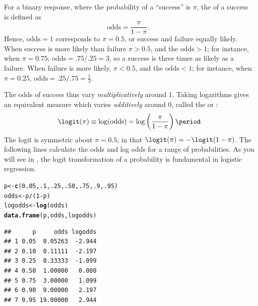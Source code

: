 \documentclass[11pt]{book}\usepackage[]{graphicx}\usepackage[]{color}
\makeatletter
\newcommand{\hlnum}[1]{\textcolor[rgb]{0.686,0.059,0.569}{#1}}%
\newcommand{\hlopt}[1]{\textcolor[rgb]{0,0,0}{#1}}%
\newcommand{\hlstd}[1]{\textcolor[rgb]{0.345,0.345,0.345}{#1}}%
\newcommand{\hlkwb}[1]{\textcolor[rgb]{0.69,0.353,0.396}{#1}}%
\newcommand{\hlkwd}[1]{\textcolor[rgb]{0.737,0.353,0.396}{\textbf{#1}}}%
\newenvironment{kframe}{%
 \def\at@end@of@kframe{}%
 \ifinner\ifhmode%
  \def\at@end@of@kframe{\end{minipage}}%
  \begin{minipage}{\columnwidth}%
 \fi\fi%
 \def\FrameCommand##1{\hskip\@totalleftmargin \hskip-\fboxsep
 \colorbox{shadecolor}{##1}\hskip-\fboxsep
     \hskip-\linewidth \hskip-\@totalleftmargin \hskip\columnwidth}%
 \MakeFramed {\advance\hsize-\width
   \@totalleftmargin\z@ \linewidth\hsize
   \@setminipage}}%
 {\par\unskip\endMakeFramed%
 \at@end@of@kframe}
\newenvironment{knitrout}{}{} %
\renewenvironment{knitrout}{\small\renewcommand{\baselinestretch}{.85}}{} %
\makeatother
\begin{document}
For a binary response, where the probability of a ``success'' is $\pi$,
the  of a success is defined as
\begin{equation*}
 \textrm{odds} = \frac{\pi}{1-\pi} \period
\end{equation*}
Hence, $\textrm{odds} = 1$ corresponds to $\pi = 0.5$, or success and
failure equally likely.   When success is more likely than failure
$\pi > 0.5$, and the $\textrm{odds} > 1$;  for instance, when $\pi = 0.75$,
$\textrm{odds} = .75/.25 =3$, so a success is three times as likely
as a failure.  When failure is more likely, $\pi < 0.5$, and the $\textrm{odds} < 1$;  for instance, when $\pi = 0.25$,
$\textrm{odds} = .25/.75 =\frac{1}{3}$.

The odds of success thus vary \emph{multiplicatively} around 1.  Taking logarithms
gives an equivalent measure which varies \emph{additively} around 0, called the
 or : 
\begin{equation}\label{eq:logit}
 \logit (\pi) \equiv \log (\mbox{odds}) = \log \left( \frac{\pi}{1-\pi} \right)
 \period
\end{equation}
The logit is symmetric about $\pi = 0.5$, in that
$\logit (\pi) = - \logit (1-\pi)$.  The following lines calculate the odds
and log odds for a range of probabilities. As you will see in
, the logit transformation of a probability is fundamental
in logistic regression.

\begin{knitrout}
\color{fgcolor}\begin{kframe}
\begin{alltt}
\hlstd{p} \hlkwb{<-} \hlkwd{c}\hlstd{(}\hlnum{0.05}\hlstd{,} \hlnum{.1}\hlstd{,} \hlnum{.25}\hlstd{,} \hlnum{.50}\hlstd{,} \hlnum{.75}\hlstd{,} \hlnum{.9}\hlstd{,} \hlnum{.95}\hlstd{)}
\hlstd{odds} \hlkwb{<-} \hlstd{p} \hlopt{/} \hlstd{(}\hlnum{1}\hlopt{-}\hlstd{p)}
\hlstd{logodds} \hlkwb{<-} \hlkwd{log}\hlstd{(odds)}
\hlkwd{data.frame}\hlstd{(p, odds, logodds)}
\end{alltt}
\begin{verbatim}
##      p     odds logodds
## 1 0.05  0.05263  -2.944
## 2 0.10  0.11111  -2.197
## 3 0.25  0.33333  -1.099
## 4 0.50  1.00000   0.000
## 5 0.75  3.00000   1.099
## 6 0.90  9.00000   2.197
## 7 0.95 19.00000   2.944
\end{verbatim}
\end{kframe}
\end{knitrout}
\end{document}
